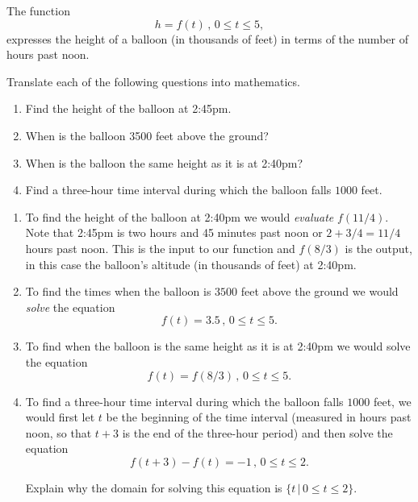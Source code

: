 \documentclass{ximera}
\begin{document}
\begin{question} \label{Q0f93r3fe}
The function 
\[
 h =  f(t) \, , \, 0\leq t \leq 5,
\] 
expresses the height of a balloon (in thousands of feet) in terms of the number of hours past noon.

Translate each of the following questions into mathematics.

\begin{enumerate}
\item Find the height of the balloon at 2:45pm.

\item When is the balloon 3500 feet above the ground?

\item When is the balloon the same height as it is at 2:40pm?

\item Find a three-hour time interval during which the balloon falls $1000$ feet.
\end{enumerate}

\begin{explanation}
\begin{enumerate}
\item To find the height of the balloon at 2:40pm we would \emph{evaluate} $f(11/4)$. Note that 2:45pm is two hours and 45 minutes past noon or $2 + 3/4 = 11/4$ hours past noon. This is the input to our function and $f(8/3)$ is the output, in this case the balloon's altitude (in thousands of feet) at 2:40pm.

\item To find the times when the balloon is $3500$ feet above the ground we would \emph{solve} the equation
\[
   f(t) = 3.5 \, , \, 0\leq t \leq 5.
\]

\item To find when the balloon is the same height as it is at 2:40pm we would solve the equation
\[
     f(t) = f(8/3) \, , \, 0\leq t \leq 5.
\]

\item To find a three-hour time interval during which the balloon falls $1000$ feet, we would first let $t$ be the beginning of the time interval (measured in hours past noon, so that $t+3$ is the end of the three-hour period) and then solve the equation 
\[
       f(t+3) - f(t) = -1 \, , \, 0\leq t \leq 2 .
\]

Explain why the domain for solving this equation is $\{t \, | \, 0\leq t \leq 2\}$.
\begin{freeResponse}
\end{freeResponse}

\end{enumerate}
\end{explanation}
\end{question}
\end{document}
